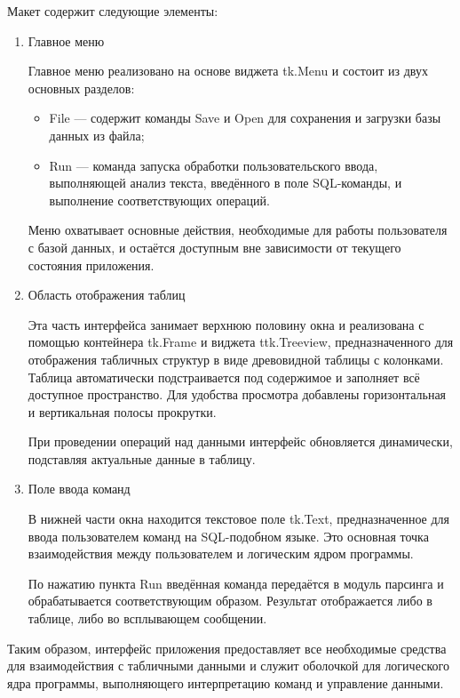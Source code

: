 Макет содержит следующие элементы:
\begin{enumerate}
	\item Главное меню
	
	Главное меню реализовано на основе виджета tk.Menu и состоит из двух основных разделов:
	\begin{itemize}
		\item File — содержит команды Save и Open для сохранения и загрузки базы данных из файла;
		\item Run — команда запуска обработки пользовательского ввода, выполняющей анализ текста, введённого в поле SQL-команды, и выполнение соответствующих операций.
	\end{itemize}
	Меню охватывает основные действия, необходимые для работы пользователя с базой данных, и остаётся доступным вне зависимости от текущего состояния приложения.
	
	\item Область отображения таблиц
	
	Эта часть интерфейса занимает верхнюю половину окна и реализована с помощью контейнера tk.Frame и виджета ttk.Treeview, предназначенного для отображения табличных структур в виде древовидной таблицы с колонками. Таблица автоматически подстраивается под содержимое и заполняет всё доступное пространство. Для удобства просмотра добавлены горизонтальная и вертикальная полосы прокрутки.
	
	При проведении операций над данными интерфейс обновляется динамически, подставляя актуальные данные в таблицу.
	
	\item Поле ввода команд
	
	В нижней части окна находится текстовое поле tk.Text, предназначенное для ввода пользователем команд на SQL-подобном языке. Это основная точка взаимодействия между пользователем и логическим ядром программы.
	
	По нажатию пункта Run введённая команда передаётся в модуль парсинга и обрабатывается соответствующим образом. Результат отображается либо в таблице, либо во всплывающем сообщении.
\end{enumerate}

Таким образом, интерфейс приложения предоставляет все необходимые средства для взаимодействия с табличными данными и служит оболочкой для логического ядра программы, выполняющего интерпретацию команд и управление данными.